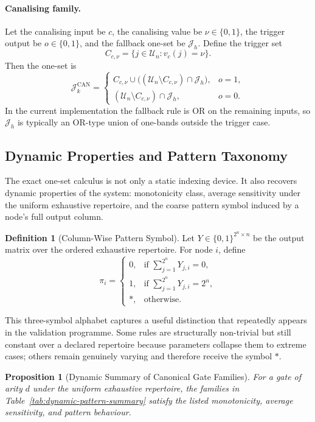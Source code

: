 \documentclass[11pt]{article}
\newtheorem{proposition}{Proposition}
\theoremstyle{definition}
\newtheorem{definition}{Definition}
\newcommand{\U}{\mathcal{U}_n}
\newcommand{\J}{\mathcal{J}}
\newcommand{\bits}{\{0,1\}}
\begin{document}
\paragraph{Canalising family.}
Let the canalising input be \(c\), the canalising value be \(\nu\in\bits\), the trigger output be \(o\in\bits\), and the fallback one-set be \(\J_h\). Define the trigger set
\[
C_{c,\nu}=\{j\in\U:v_c(j)=\nu\}.
\]
Then the one-set is
\[
\J_k^{\mathrm{CAN}}
=
\begin{cases}
C_{c,\nu}\cup\bigl((\U\setminus C_{c,\nu})\cap \J_h\bigr), & o=1,\\[4pt]
(\U\setminus C_{c,\nu})\cap \J_h, & o=0.
\end{cases}
\]
In the current implementation the fallback rule is OR on the remaining inputs, so \(\J_h\) is typically an OR-type union of one-bands outside the trigger case.

\subsection{Dynamic Properties and Pattern Taxonomy}
The exact one-set calculus is not only a static indexing device. It also recovers dynamic properties
of the system: monotonicity class, average sensitivity under the uniform exhaustive repertoire, and the coarse pattern symbol induced by a node's full output column.

\begin{definition}[Column-Wise Pattern Symbol]
Let \(Y\in\bits^{2^n\times n}\) be the output matrix over the ordered exhaustive repertoire. For node \(i\), define
\[
\pi_i=
\begin{cases}
0, & \text{if } \sum_{j=1}^{2^n} Y_{j,i}=0,\\
1, & \text{if } \sum_{j=1}^{2^n} Y_{j,i}=2^n,\\
*, & \text{otherwise.}
\end{cases}
\]
\end{definition}

This three-symbol alphabet captures a useful distinction that repeatedly appears in the validation programme. Some rules are structurally non-trivial but still constant over a declared repertoire because parameters collapse them to extreme cases; others remain genuinely varying and therefore receive the symbol \(*\).

\begin{proposition}[Dynamic Summary of Canonical Gate Families]\label{prop:dynamic-summary}
For a gate of arity \(d\) under the uniform exhaustive repertoire, the families in Table~\ref{tab:dynamic-pattern-summary} satisfy the listed monotonicity, average sensitivity, and pattern behaviour.
\end{proposition}
\end{document}
